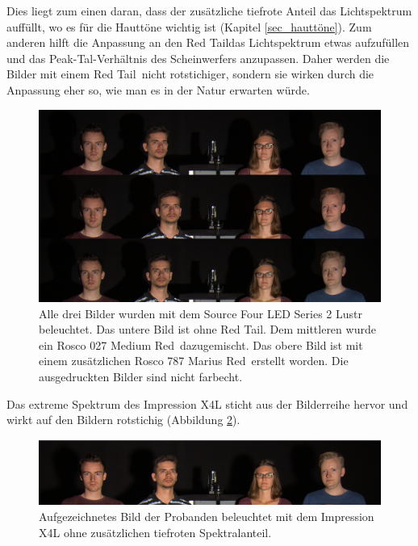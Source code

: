 \noindent Dies liegt zum einen daran, dass der zusätzliche tiefrote Anteil das Lichtspektrum auffüllt, wo es für die Hauttöne wichtig ist (Kapitel \ref{sec_hauttöne}).
Zum anderen hilft die Anpassung an den \glqq Red Tail\grqq  das Lichtspektrum etwas aufzufüllen und das Peak-Tal-Verhältnis des Scheinwerfers anzupassen. Daher werden die Bilder mit einem \glqq Red Tail\grqq\ nicht rotstichiger, sondern sie wirken durch die Anpassung eher so, wie man es in der Natur erwarten würde.

\begin{figure}[H]     %
\centering
\includegraphics[width=1.0\textwidth]{bilder/vergleich} 
\caption {Alle drei Bilder wurden mit dem Source Four LED Series 2 Lustr beleuchtet. Das untere Bild ist ohne \glqq Red Tail\grqq . Dem mittleren wurde ein Rosco 027 \glqq Medium Red\grqq\ dazugemischt. Das obere Bild ist mit einem zusätzlichen Rosco 787 \glqq Marius Red\grqq\ erstellt worden. Die ausgedruckten Bilder sind nicht farbecht.} \label{b_vergleich}
\end{figure}

\newpage
\noindent Das extreme Spektrum des Impression X4L sticht aus der Bilderreihe hervor und wirkt auf den Bildern rotstichig (Abbildung \ref{b_umfrageglpbild}). 

\begin{figure}[H]     %
\centering
\includegraphics[width=1.0\textwidth]{bilder/umfrageglpbild} 
\caption {Aufgezeichnetes Bild der Probanden beleuchtet mit dem Impression X4L ohne zusätzlichen tiefroten Spektralanteil.} \label{b_umfrageglpbild}
\end{figure}

